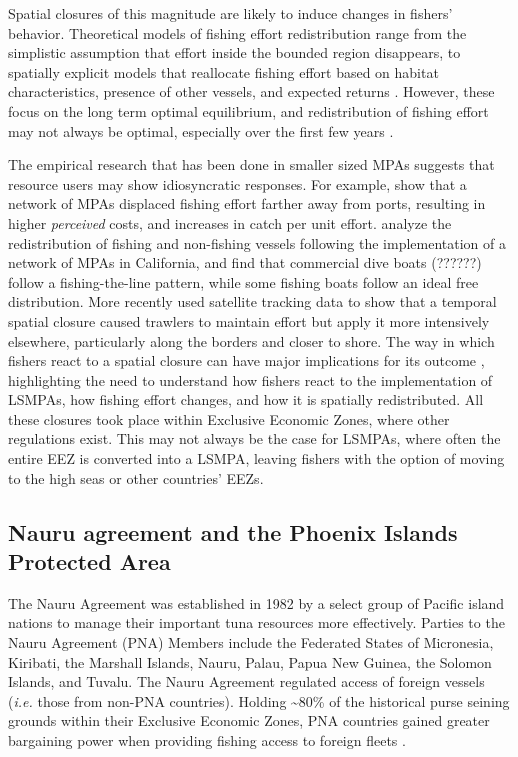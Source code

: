 \documentclass[11pt,english]{article}
\begin{document}
Spatial closures of this magnitude are likely to induce changes in
fishers' behavior. Theoretical models of fishing effort redistribution
range from the simplistic assumption that effort inside the bounded
region disappears, to spatially explicit models that reallocate fishing
effort based on habitat characteristics, presence of other vessels, and
expected returns \citep{smith_2003,hilborn_2006}. However, these focus
on the long term optimal equilibrium, and redistribution of fishing
effort may not always be optimal, especially over the first few years
\citep{stevenson_2013}.

The empirical research that has been done in smaller sized MPAs
suggests that resource users may show idiosyncratic responses. For
example, \citet{stevenson_2013} show that a network of MPAs displaced
fishing effort farther away from ports, resulting in higher
\emph{perceived} costs, and increases in catch per unit effort.
\citet{cabral_2017} analyze the redistribution of fishing and
non-fishing vessels following the implementation of a network of MPAs in
California, and find that commercial dive boats (??????) follow a
fishing-the-line pattern, while some fishing boats follow an ideal free
distribution. More recently \citet{elahi_2018} used satellite tracking
data to show that a temporal spatial closure caused trawlers to maintain
effort but apply it more intensively elsewhere, particularly along the
borders and closer to shore. The way in which fishers react to a spatial
closure can have major implications for its outcome
\citep{smith_2003,hilborn_2006}, highlighting the need to understand how
fishers react to the implementation of LSMPAs, how fishing effort
changes, and how it is spatially redistributed. All these closures took
place within Exclusive Economic Zones, where other regulations exist.
This may not always be the case for LSMPAs, where often the entire EEZ
is converted into a LSMPA, leaving fishers with the option of moving to
the high seas or other countries' EEZs.

\hypertarget{nauru-agreement-and-the-phoenix-island-protected-area}{%
\subsection{Nauru agreement and the Phoenix Islands Protected
Area}\label{nauru-agreement-and-the-phoenix-island-protected-area}}

The Nauru Agreement was established in 1982 by a select group of Pacific
island nations to manage their important tuna resources more effectively. Parties to the Nauru Agreement (PNA) Members
include the Federated States of Micronesia, Kiribati, the Marshall Islands,
Nauru, Palau, Papua New Guinea, the Solomon Islands, and Tuvalu. The Nauru
Agreement regulated access of foreign vessels (\emph{i.e.} those from
non-PNA countries). Holding \textasciitilde{}80\% of the historical
purse seining grounds within their Exclusive Economic Zones, PNA
countries gained greater bargaining power when providing fishing access to foreign
fleets \citep{havice_2010}.
\end{document}
